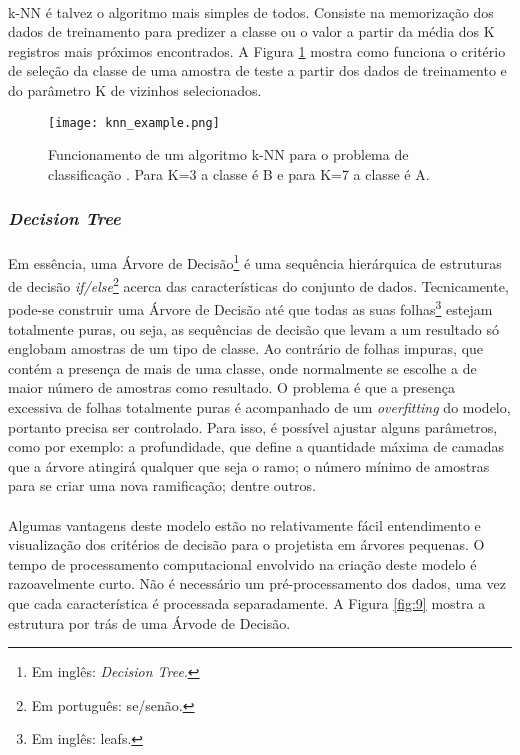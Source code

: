 \paragraph{} k-NN é talvez o algoritmo mais simples de todos. Consiste na memorização dos dados de treinamento para predizer a classe ou o valor a partir da média dos K registros mais próximos encontrados. A Figura \ref{fig:8} mostra como funciona o critério de seleção da classe de uma amostra de teste a partir dos dados de treinamento e do parâmetro K de vizinhos selecionados.

\begin{figure}[h]
    \texttt{[image: knn\_example.png]}
    \centering
    \caption{Funcionamento de um algoritmo k-NN para o problema de classificação \cite{knn_classification}. Para K=3 a classe é B e para K=7 a classe é A.}
    \label{fig:8}
\end{figure}

\subsubsection*{\textit{Decision Tree}}

\paragraph{} Em essência, uma Árvore de Decisão\footnote{Em inglês: \textit{Decision Tree}.} é uma sequência hierárquica de estruturas de decisão \textit{if/else}\footnote{Em português: se/senão.} acerca das características do conjunto de dados. Tecnicamente, pode-se construir uma Árvore de Decisão até que todas as suas folhas\footnote{Em inglês: leafs.} estejam totalmente puras, ou seja, as sequências de decisão que levam a um resultado só englobam amostras de um tipo de classe. Ao contrário de folhas impuras, que contém a presença de mais de uma classe, onde normalmente se escolhe a de maior número de amostras como resultado. O problema é que a presença excessiva de folhas totalmente puras é acompanhado de um \textit{overfitting} do modelo, portanto precisa ser controlado. Para isso, é possível ajustar alguns parâmetros, como por exemplo: a profundidade, que define a quantidade máxima de camadas que a árvore atingirá qualquer que seja o ramo; o número mínimo de amostras para se criar uma nova ramificação; dentre outros.

\paragraph{} Algumas vantagens deste modelo estão no relativamente fácil entendimento e visualização dos critérios de decisão para o projetista em árvores pequenas. O tempo de processamento computacional envolvido na criação deste modelo é razoavelmente curto. Não é necessário um pré-processamento dos dados, uma vez que cada característica é processada separadamente. A Figura \ref{fig:9} mostra a estrutura por trás de uma Árvode de Decisão.

